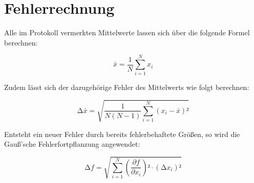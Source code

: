 \section{Fehlerrechnung}
\label{sec:Fehlerrechnung}

Alle im Protokoll vermerkten Mittelwerte lassen sich über die folgende Formel berechnen:

\begin{equation}
\label{eqn:Mittelwert}
    \bar{x} = \frac{1}{N}\sum_{i=1}^N x_i
\end{equation}

\noindent Zudem lässt sich der dazugehörige Fehler des Mittelwerts wie folgt berechnen:

\begin{equation}
\label{eqn:Mittelwertfehler}
    \increment \bar{x} = \sqrt{\frac{1}{N\left(N-1\right)}\sum_{i=1}^N \left(x_i - \bar{x}\right)²}
\end{equation}

\noindent Entsteht ein neuer Fehler durch bereits fehlerbehaftete Größen, so wird die Gauß'sche Fehlerfortpflanzung angewendet:

\begin{equation}
\label{eqn:Fehlerfortpflanzung}
    \increment f = \sqrt{\sum_{i=1}^N \left(\frac{\partial f}{\partial x_i}\right)²\cdot\left(\increment x_i\right)²}
\end{equation}

